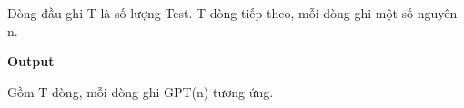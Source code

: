 Dòng đầu ghi T là số lượng Test. T dòng tiếp theo, mỗi dòng ghi một số nguyên n.  

\textbf{    Output   }

   Gồm T dòng, mỗi dòng ghi GPT(n) tương ứng.